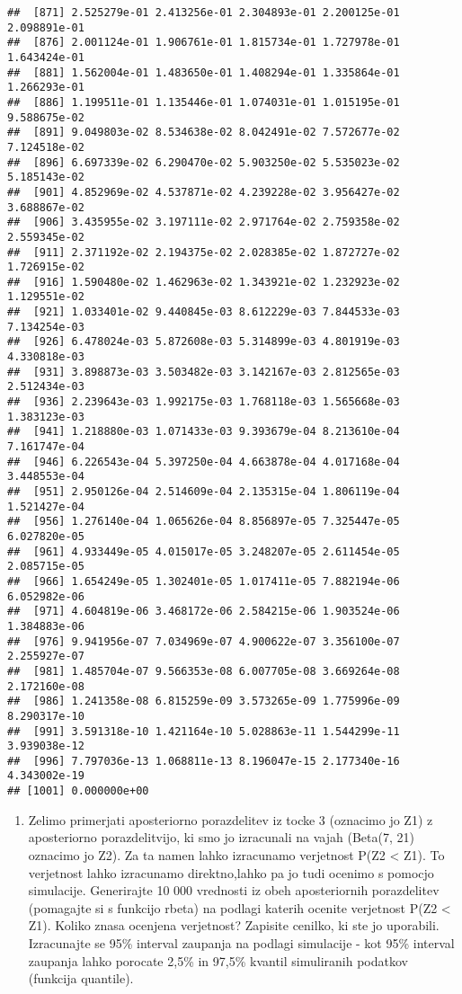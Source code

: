 \documentclass[
]{article}
\providecommand{\tightlist}{%
  \setlength{\itemsep}{0pt}\setlength{\parskip}{0pt}}
\begin{document}
\begin{verbatim}
##  [871] 2.525279e-01 2.413256e-01 2.304893e-01 2.200125e-01 2.098891e-01
##  [876] 2.001124e-01 1.906761e-01 1.815734e-01 1.727978e-01 1.643424e-01
##  [881] 1.562004e-01 1.483650e-01 1.408294e-01 1.335864e-01 1.266293e-01
##  [886] 1.199511e-01 1.135446e-01 1.074031e-01 1.015195e-01 9.588675e-02
##  [891] 9.049803e-02 8.534638e-02 8.042491e-02 7.572677e-02 7.124518e-02
##  [896] 6.697339e-02 6.290470e-02 5.903250e-02 5.535023e-02 5.185143e-02
##  [901] 4.852969e-02 4.537871e-02 4.239228e-02 3.956427e-02 3.688867e-02
##  [906] 3.435955e-02 3.197111e-02 2.971764e-02 2.759358e-02 2.559345e-02
##  [911] 2.371192e-02 2.194375e-02 2.028385e-02 1.872727e-02 1.726915e-02
##  [916] 1.590480e-02 1.462963e-02 1.343921e-02 1.232923e-02 1.129551e-02
##  [921] 1.033401e-02 9.440845e-03 8.612229e-03 7.844533e-03 7.134254e-03
##  [926] 6.478024e-03 5.872608e-03 5.314899e-03 4.801919e-03 4.330818e-03
##  [931] 3.898873e-03 3.503482e-03 3.142167e-03 2.812565e-03 2.512434e-03
##  [936] 2.239643e-03 1.992175e-03 1.768118e-03 1.565668e-03 1.383123e-03
##  [941] 1.218880e-03 1.071433e-03 9.393679e-04 8.213610e-04 7.161747e-04
##  [946] 6.226543e-04 5.397250e-04 4.663878e-04 4.017168e-04 3.448553e-04
##  [951] 2.950126e-04 2.514609e-04 2.135315e-04 1.806119e-04 1.521427e-04
##  [956] 1.276140e-04 1.065626e-04 8.856897e-05 7.325447e-05 6.027820e-05
##  [961] 4.933449e-05 4.015017e-05 3.248207e-05 2.611454e-05 2.085715e-05
##  [966] 1.654249e-05 1.302401e-05 1.017411e-05 7.882194e-06 6.052982e-06
##  [971] 4.604819e-06 3.468172e-06 2.584215e-06 1.903524e-06 1.384883e-06
##  [976] 9.941956e-07 7.034969e-07 4.900622e-07 3.356100e-07 2.255927e-07
##  [981] 1.485704e-07 9.566353e-08 6.007705e-08 3.669264e-08 2.172160e-08
##  [986] 1.241358e-08 6.815259e-09 3.573265e-09 1.775996e-09 8.290317e-10
##  [991] 3.591318e-10 1.421164e-10 5.028863e-11 1.544299e-11 3.939038e-12
##  [996] 7.797036e-13 1.068811e-13 8.196047e-15 2.177340e-16 4.343002e-19
## [1001] 0.000000e+00
\end{verbatim}

\begin{enumerate}
\def\labelenumi{\arabic{enumi}.}
\setcounter{enumi}{3}
\tightlist
\item
  Zelimo primerjati aposteriorno porazdelitev iz tocke 3 (oznacimo jo
  Z1) z aposteriorno porazdelitvijo, ki smo jo izracunali na vajah
  (Beta(7, 21) oznacimo jo Z2). Za ta namen lahko izracunamo verjetnost
  P(Z2 \textless{} Z1). To verjetnost lahko izracunamo direktno,lahko pa
  jo tudi ocenimo s pomocjo simulacije. Generirajte 10 000 vrednosti iz
  obeh aposteriornih porazdelitev (pomagajte si s funkcijo rbeta) na
  podlagi katerih ocenite verjetnost P(Z2 \textless{} Z1). Koliko znasa
  ocenjena verjetnost? Zapisite cenilko, ki ste jo uporabili.
  Izracunajte se 95\% interval zaupanja na podlagi simulacije - kot 95\%
  interval zaupanja lahko porocate 2,5\% in 97,5\% kvantil simuliranih
  podatkov (funkcija quantile).
\end{enumerate}
\end{document}

